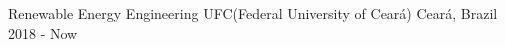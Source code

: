 

\begin{cventries}

  \cventry
    {Renewable Energy Engineering} %
    {UFC(Federal University of Ceará)} %
    {Ceará, Brazil} %
    {2018 - Now} %
    {
      \begin{cvitems} %
      \end{cvitems}
    }

\end{cventries}
